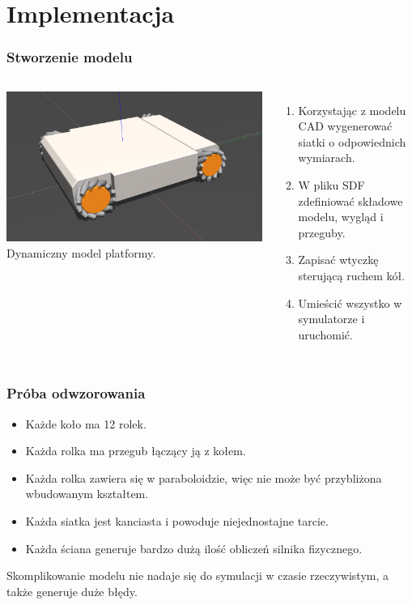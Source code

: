 \documentclass{beamer}
\begin{document}
	\section{Implementacja}
	\begin{frame}
		\frametitle{Stworzenie modelu}
		\begin{columns}[c]
			\centering
			\includegraphics[width=\textwidth]{graphics/model.png} \\
			Dynamiczny model platformy.
			\begin{enumerate}
			\item Korzystając z modelu CAD wygenerować siatki o odpowiednich wymiarach.
			\item W pliku SDF zdefiniować składowe modelu, wygląd i przeguby.
			\item Zapisać wtyczkę sterującą ruchem kół.
			\item Umieścić wszystko w symulatorze i uruchomić.
		\end{enumerate}
		\end{columns}
	\end{frame}
	\begin{frame}
		\frametitle{Próba odwzorowania}
		\begin{itemize}
		\item Każde koło ma 12 rolek.
		\item Każda rolka ma przegub łączący ją z kołem.
		\item Każda rolka zawiera się w paraboloidzie, więc nie może być przybliżona wbudowanym kształtem.
		\item Każda siatka jest kanciasta i powoduje niejednostajne tarcie.
		\item Każda ściana generuje bardzo dużą ilość obliczeń silnika fizycznego.
		\end{itemize}
		Skomplikowanie modelu nie nadaje się do symulacji w czasie rzeczywistym, a także generuje duże błędy.
	\end{frame}
\end{document}

